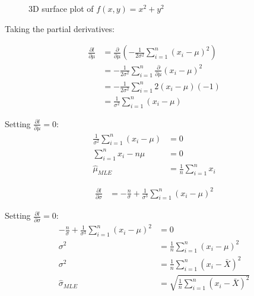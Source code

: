 \documentclass{article}
\begin{document}
\begin{figure}[h]
    \centering
    \caption{3D surface plot of $f(x,y)=x^2+y^2$}
\end{figure}



Taking the partial derivatives:

\begin{align*}
    \frac{\partial l}{\partial \mu} &= \frac{\partial}{\partial \mu}\left(-\frac{1}{2\sigma^2} \sum_{i=1}^{n}(x_i-\mu)^2\right) \\
    &= -\frac{1}{2\sigma^2} \sum_{i=1}^{n} \frac{\partial}{\partial \mu}(x_i-\mu)^2 \\
    &= -\frac{1}{2\sigma^2} \sum_{i=1}^{n} 2(x_i-\mu)(-1) \\
    &= \frac{1}{\sigma^2} \sum_{i=1}^{n}(x_i-\mu)
\end{align*}

Setting $\frac{\partial l}{\partial \mu} = 0$:
\begin{align*}
    \frac{1}{\sigma^2} \sum_{i=1}^{n} (x_i - \mu) &= 0 \\
    \sum_{i=1}^{n} x_i - n\mu &= 0 \\
    \hat{\mu}_{MLE} &= \frac{1}{n}\sum_{i=1}^{n}x_i
\end{align*}

\begin{align*}
    \frac{\partial l}{\partial \sigma} &= -\frac{n}{\sigma} + \frac{1}{\sigma^3}\sum_{i=1}^{n}(x_i-\mu)^2
\end{align*}

Setting $\frac{\partial l}{\partial \sigma} = 0$:
\begin{align*}
    -\frac{n}{\sigma} + \frac{1}{\sigma^3}\sum_{i=1}^{n}(x_i - \mu)^2 &= 0 \\
    \sigma^2 &= \frac{1}{n}\sum_{i=1}^{n}(x_i - \mu)^2 \\
    \sigma^2 &= \frac{1}{n}\sum_{i=1}^{n}(x_i - \bar{X})^2 \\
    \hat{\sigma}_{MLE} &= \sqrt{\frac{1}{n}\sum_{i=1}^{n}(x_i - \bar{X})^2}
\end{align*}



    
\end{document}
